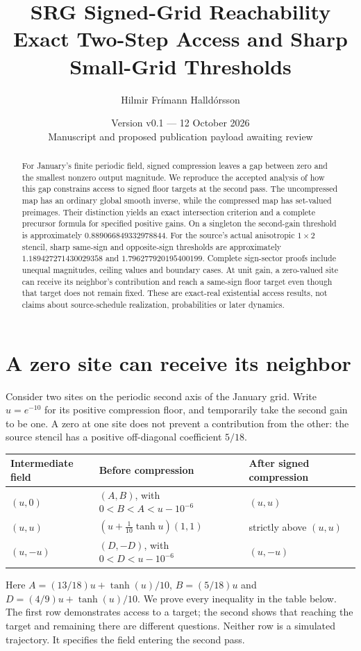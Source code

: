 \documentclass[11pt,a4paper]{article}
\title{\textbf{SRG Signed-Grid Reachability}\\[4pt]
\large Exact Two-Step Access and Sharp Small-Grid Thresholds}
\author{Hilmir Frímann Halldórsson}
\date{Version v0.1 --- 12 October 2026\\[3pt]\small Manuscript and proposed publication payload awaiting review}
\theoremstyle{definition}
\theoremstyle{remark}\newtheorem{remark}[theorem]{Remark}
\numberwithin{equation}{section}
\begin{document}
\maketitle
\begin{abstract}
For January's finite periodic field, signed compression leaves a gap between zero
and the smallest nonzero output magnitude. We reproduce the accepted analysis of
how this gap constrains access to signed floor targets at the second pass.
The uncompressed map has an ordinary global smooth inverse, while the compressed
map has set-valued preimages. Their distinction yields an exact intersection
criterion and a complete precursor formula for specified positive gains.
On a singleton the second-gain threshold is approximately $0.889066849332978844$.
For the source's actual anisotropic $1\times2$ stencil, sharp same-sign and
opposite-sign thresholds are approximately $1.189427271430029358$ and
$1.796277920195400199$. Complete sign-sector proofs include unequal magnitudes,
ceiling values and boundary cases. At unit gain, a zero-valued site can receive its
neighbor's contribution and reach a same-sign floor target even though that target
does not remain fixed. These are exact-real existential access results, not
claims about source-schedule realization, probabilities or later dynamics.
\end{abstract}

\section{A zero site can receive its neighbor}\label{sec:opening}
Consider two sites on the periodic second axis of the January grid. Write
$u=e^{-10}$ for its positive compression floor, and temporarily take the second
gain to be one. A zero at one site does not prevent a contribution from the other:
the source stencil has a positive off-diagonal coefficient $5/18$.

\begin{center}
\begin{tabular}{@{}lll@{}}
\toprule Intermediate field & Before compression & After signed compression\\
\midrule
$(u,0)$ & $(A,B)$, with $0<B<A<u-10^{-6}$ & $(u,u)$\\
$(u,u)$ & $(u+\tfrac1{10}\tanh u)(1,1)$ & strictly above $(u,u)$\\
$(u,-u)$ & $(D,-D)$, with $0<D<u-10^{-6}$ & $(u,-u)$\\
\bottomrule
\end{tabular}
\end{center}
Here $A=(13/18)u+\tanh(u)/10$, $B=(5/18)u$ and
$D=(4/9)u+\tanh(u)/10$. We prove every inequality in the table below.
The first row demonstrates access to a target; the second shows that reaching
the target and remaining there are different questions. Neither row is a simulated
trajectory. It specifies the field entering the second pass.
\end{document}
